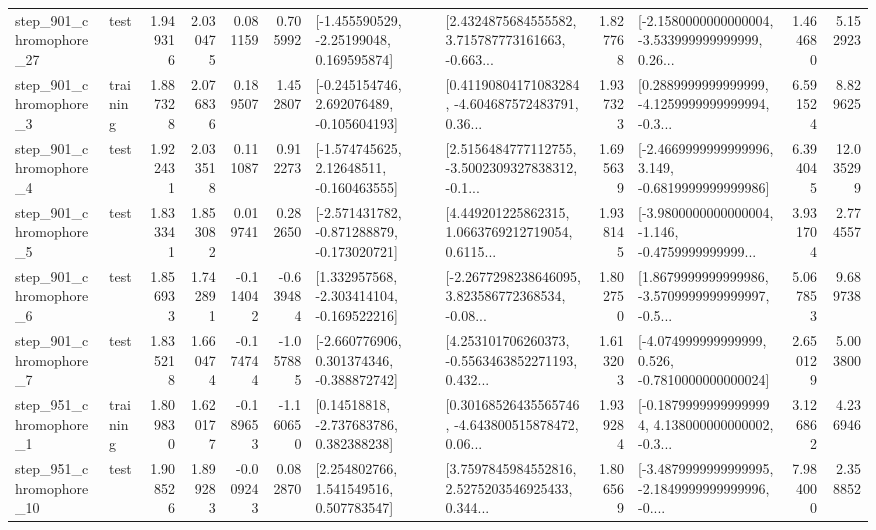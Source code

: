 \begin{tabular}{llrrrrllrlrr}
  step\_901\_chromophore\_27 &      test &      1.949316 &    2.030475 &      0.081159 &  0.705992 &    [-1.455590529, -2.25199048, 0.169595874] &  [2.4324875684555582, 3.715787773161663, -0.663... &       1.827768 &  [-2.1580000000000004, -3.533999999999999, 0.26... &            1.464680 &          5.152923 \\
   step\_901\_chromophore\_3 &  training &      1.887328 &    2.076836 &      0.189507 &  1.452807 &   [-0.245154746, 2.692076489, -0.105604193] &  [0.41190804171083284, -4.604687572483791, 0.36... &       1.937323 &  [0.2889999999999999, -4.1259999999999994, -0.3... &            6.591524 &          8.829625 \\
   step\_901\_chromophore\_4 &      test &      1.922431 &    2.033518 &      0.111087 &  0.912273 &    [-1.574745625, 2.12648511, -0.160463555] &  [2.5156484777112755, -3.5002309327838312, -0.1... &       1.695639 &  [-2.4669999999999996, 3.149, -0.6819999999999986] &            6.394045 &         12.035299 \\
   step\_901\_chromophore\_5 &      test &      1.833341 &    1.853082 &      0.019741 &  0.282650 &  [-2.571431782, -0.871288879, -0.173020721] &  [4.449201225862315, 1.0663769212719054, 0.6115... &       1.938145 &  [-3.9800000000000004, -1.146, -0.4759999999999... &            3.931704 &          2.774557 \\
   step\_901\_chromophore\_6 &      test &      1.856933 &    1.742891 &     -0.114042 & -0.639484 &   [1.332957568, -2.303414104, -0.169522216] &  [-2.2677298238646095, 3.823586772368534, -0.08... &       1.802750 &  [1.8679999999999986, -3.5709999999999997, -0.5... &            5.067853 &          9.689738 \\
   step\_901\_chromophore\_7 &      test &      1.835218 &    1.660474 &     -0.174744 & -1.057885 &   [-2.660776906, 0.301374346, -0.388872742] &  [4.253101706260373, -0.5563463852271193, 0.432... &       1.613203 &   [-4.074999999999999, 0.526, -0.7810000000000024] &            2.650129 &          5.003800 \\
   step\_951\_chromophore\_1 &  training &      1.809830 &    1.620177 &     -0.189653 & -1.160650 &     [0.14518818, -2.737683786, 0.382388238] &  [0.30168526435565746, -4.643800515878472, 0.06... &       1.939284 &  [-0.18799999999999994, 4.138000000000002, -0.3... &            3.126862 &          4.236946 \\
  step\_951\_chromophore\_10 &      test &      1.908526 &    1.899283 &     -0.009243 &  0.082870 &     [2.254802766, 1.541549516, 0.507783547] &  [3.7597845984552816, 2.5275203546925433, 0.344... &       1.806569 &  [-3.4879999999999995, -2.1849999999999996, -0.... &            7.984000 &          2.358852 \\

\end{tabular}
